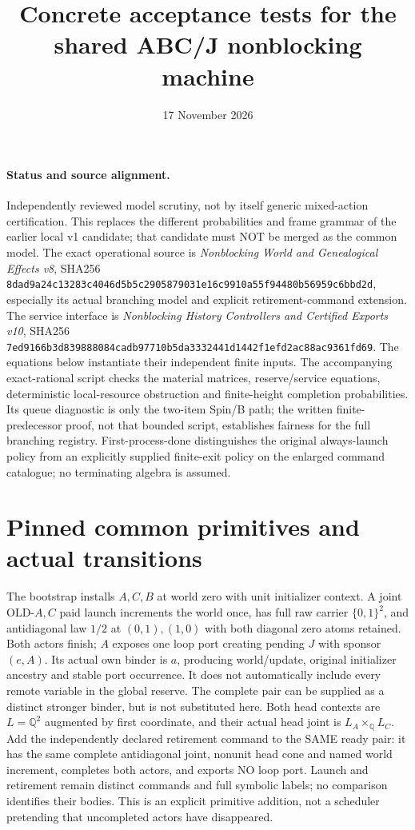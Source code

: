 \documentclass[11pt]{article}
\title{Concrete acceptance tests for the shared ABC/J nonblocking machine}
\date{17 November 2026}
\begin{document}
\maketitle
\paragraph{Status and source alignment.} Independently reviewed model scrutiny, not by itself generic mixed-action certification. This replaces the different probabilities and frame grammar of the earlier local v1 candidate; that candidate must NOT be merged as the common model. The exact operational source is \emph{Nonblocking World and Genealogical Effects v8}, SHA256 \texttt{8dad9a24c13283c4046d5b5c2905879031e16c9910a55f94480b56959c6bbd2d}, especially its actual branching model and explicit retirement-command extension. The service interface is \emph{Nonblocking History Controllers and Certified Exports v10}, SHA256 \texttt{7ed9166b3d839888084cadb97710b5da3332441d1442f1efd2ac88ac9361fd69}. The equations below instantiate their independent finite inputs. The accompanying exact-rational script checks the material matrices, reserve/service equations, deterministic local-resource obstruction and finite-height completion probabilities. Its queue diagnostic is only the two-item Spin/B path; the written finite-predecessor proof, not that bounded script, establishes fairness for the full branching registry. First-process-done distinguishes the original always-launch policy from an explicitly supplied finite-exit policy on the enlarged command catalogue; no terminating algebra is assumed.

\section{Pinned common primitives and actual transitions}
The bootstrap installs $A,C,B$ at world zero with unit initializer context. A joint OLD-$A,C$ paid launch increments the world once, has full raw carrier $\{0,1\}^2$, and antidiagonal law $1/2$ at $(0,1),(1,0)$ with both diagonal zero atoms retained. Both actors finish; $A$ exposes one loop port creating pending $J$ with sponsor $(e,A)$. Its actual own binder is $a$, producing world/update, original initializer ancestry and stable port occurrence. It does not automatically include every remote variable in the global reserve. The complete pair can be supplied as a distinct stronger binder, but is not substituted here. Both head contexts are $L=\mathbb Q^2$ augmented by first coordinate, and their actual head joint is $L_A\times_{\mathbb Q}L_C$. Add the independently declared retirement command to the SAME ready pair: it has the same complete antidiagonal joint, nonunit head cone and named world increment, completes both actors, and exports NO loop port. Launch and retirement remain distinct commands and full symbolic labels; no comparison identifies their bodies. This is an explicit primitive addition, not a scheduler pretending that uncompleted actors have disappeared.
\end{document}
